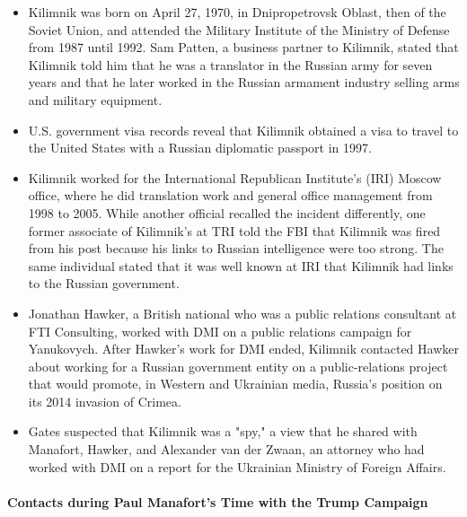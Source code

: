 \begin{itemize}

    \item Kilimnik was born on April 27, 1970, in Dnipropetrovsk Oblast, then of the Soviet Union, and attended the Military Institute of the Ministry of Defense from 1987 until 1992.%
    Sam Patten, a business partner to Kilimnik,%
    stated that Kilimnik told him that he was a translator in the Russian army for seven years and that he later worked in the Russian armament industry selling arms and military equipment.%

    \item U.S. government visa records reveal that Kilimnik obtained a visa to travel to the United States with a Russian diplomatic passport in 1997.%

    \item Kilimnik worked for the International Republican Institute's (IRI) Moscow office, where he did translation work and general office management from 1998 to 2005.%
    While another official recalled the incident differently,%
    one former associate of Kilimnik's at TRI told the FBI that Kilimnik was fired from his post because his links to Russian intelligence were too strong.
    The same individual stated that it was well known at IRI that Kilimnik had links to the Russian government.%

    \item Jonathan Hawker, a British national who was a public relations consultant at FTI Consulting, worked with DMI on a public relations campaign for Yanukovych.
    After Hawker's work for DMI ended, Kilimnik contacted Hawker about working for a Russian government entity on a public-relations project that would promote, in Western and Ukrainian media, Russia's position on its 2014 invasion of Crimea.%

    \item Gates suspected that Kilimnik was a "spy," a view that he shared with Manafort, Hawker, and Alexander van der Zwaan,%
    an attorney who had worked with DMI on a report for the Ukrainian Ministry of Foreign Affairs.%
\end{itemize}


\paragraph{Contacts during Paul Manafort's Time with the Trump Campaign}

